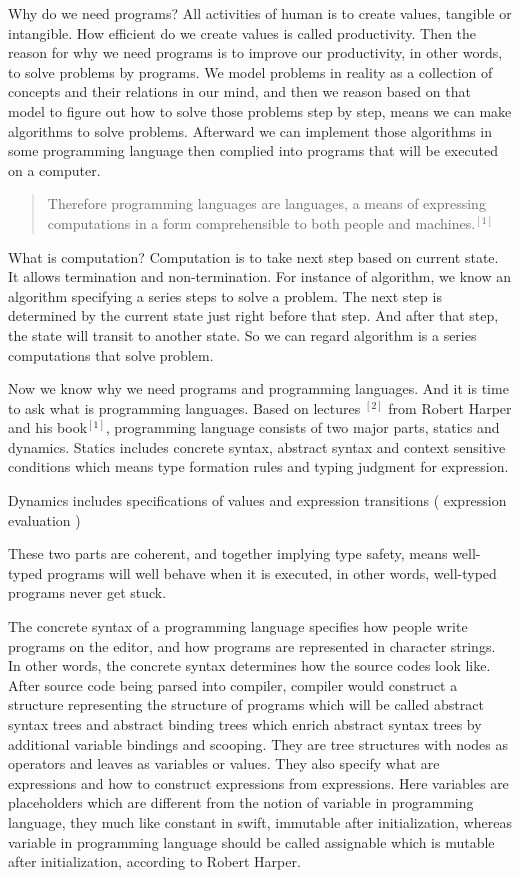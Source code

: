 \documentclass{article}
\begin{document}
Why do we need programs? All activities of human is to create values, tangible or intangible. How efficient do we create values is called productivity. Then the reason for why we need programs is to improve our productivity, in other words, to solve problems by programs. We model problems in reality as a collection of concepts and their relations in our mind, and then we reason based on that model to figure out how to solve those problems step by step, means we can make algorithms to solve problems. Afterward we can implement those algorithms in some programming language then complied into programs that will be executed on a computer. 
\begin{quote}
Therefore programming languages are languages, a means of expressing computations in a form comprehensible to both people and machines.$^{[1]}$
\end{quote}
What is computation? Computation is to take next step based on current state. It allows termination and non-termination. For instance of algorithm, we know an algorithm specifying a series steps to solve a problem. The next step is determined by the current state just right before that step. And after that step, the state will transit to another state. So we can regard algorithm is a series computations that solve problem.


Now we know why we need programs and programming languages. And it is time to ask what is programming languages. Based on lectures $^{[2]}$ from Robert Harper and his book$^{[1]}$, programming language consists of two major parts, statics and dynamics. Statics includes concrete syntax, abstract syntax and context sensitive conditions which means type formation rules and typing judgment for expression.


Dynamics includes specifications of values and expression transitions ( expression evaluation )


These two parts are coherent, and together implying type safety, means well-typed programs will well behave when it is executed, in other words, well-typed programs never get stuck.


The concrete syntax of a programming language specifies how people write programs on the editor, and how programs are represented in character strings. In other words, the concrete syntax determines how the source codes look like. After source code being parsed into compiler, compiler would construct a structure representing the structure of programs which will be called abstract syntax trees and abstract binding trees which enrich abstract syntax trees by additional variable bindings and scooping. They are tree structures with nodes as operators and leaves as variables or values. They also specify what are expressions and how to construct expressions from expressions.  Here variables are placeholders which are different from the notion of variable in programming language, they much like constant in swift, immutable after initialization, whereas variable in programming language should be called assignable which is mutable after initialization, according to Robert Harper.
\end{document}
